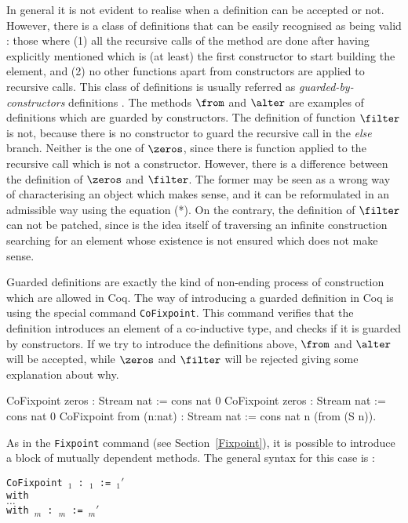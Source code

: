 In general it is not evident to realise when a definition can 
be accepted or not. However, there is a class of definitions that
can be easily recognised as being valid :  those 
where (1) all the recursive calls of the method  are done 
after having explicitly mentioned  which is (at least) the first constructor 
to start building the element, and (2) no other 
functions apart from constructors are applied to recursive calls. 
This class of definitions is usually
referred as {\it guarded-by-constructors} 
definitions \cite{Coquand93,Gim94}. 
The methods $\from$ 
and $\alter$ are examples of definitions which are guarded by constructors.
The definition of function $\filter$ is not, because there is no 
constructor to guard 
the recursive call in the {\it else} branch. Neither is the one of
$\zeros$, since there is function applied to the recursive call
which is not a constructor. However, there is a difference between 
the definition of $\zeros$ and $\filter$. The former may be seen as a
wrong way of characterising an object which makes sense, and it can
be reformulated in an admissible way using the equation (*). On the contrary, 
the definition of
$\filter$ can not be patched, since is the idea itself 
of traversing an infinite
construction searching for an element whose existence is not ensured
which does not make sense.



Guarded definitions are exactly the kind of non-ending process of 
construction which are allowed in Coq. The way of introducing 
a guarded definition in Coq is using the special command 
{\tt CoFixpoint}.  This command verifies that the definition introduces an
element of a co-inductive type, and checks if it is guarded by constructors. 
If we try to 
introduce the definitions above, $\from$ and $\alter$ will be accepted,
while $\zeros$ and $\filter$ will be rejected giving some explanation 
about why.
\begin{coq_example}
CoFixpoint zeros  : Stream nat := cons nat 0%
CoFixpoint zeros  : Stream nat := cons nat 0%
CoFixpoint from (n:nat) : Stream nat := cons nat n (from (S n)).
\end{coq_example}

As in the \verb!Fixpoint! command (see Section~\ref{Fixpoint}), it is possible 
to introduce a block of mutually dependent methods. The general syntax
for this case is :

{\tt CoFixpoint {\ident$_1$} : {\term$_1$} := {\term$_1'$}\\
     with\\
        \mbox{}\hspace{0.1cm} $\ldots$  \\
        with {\ident$_m$}   : {\term$_m$} := {\term$_m'$}}


